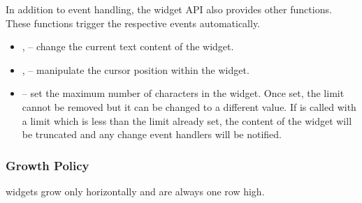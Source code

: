In addition to event handling, the  widget API also provides
other functions.  These functions trigger the respective events
automatically.

\begin{itemize}
\item {},  -- change the current text
  content of the  widget.
\item {},  --
  manipulate the cursor position within the  widget.
\item {} -- set the maximum number of characters in
  the  widget.  Once set, the limit cannot be removed but it
  can be changed to a different value.  If  is
  called with a limit which is less than the limit already set, the
  content of the  widget will be truncated and any change
  event handlers will be notified.
\end{itemize}

\subsubsection{Growth Policy}

 widgets grow only horizontally and are always one row high.
